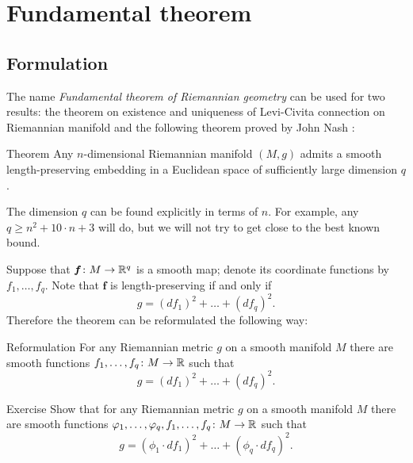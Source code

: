 \chapter{Fundamental theorem}

\section{Formulation}

The name \emph{Fundamental theorem of Riemannian geometry} can be used for two results: the theorem on existence and uniqueness of Levi-Civita connection on Riemannian manifold and the following theorem proved by John Nash \cite{nash}:

\begin{thm}{Theorem}
Any $n$-dimensional Riemannian manifold $(M,g)$ admits a smooth length-preserving embedding in a Euclidean space of sufficiently large dimension $q$.
\end{thm}

The dimension $q$ can be found explicitly in terms of $n$.
For example, any $q\ge n^2+10\cdot n+3$ will do, but we will not try to get close to the best known bound.

Suppose that $\bm{f}\colon M\to \mathbb{R}^q$ is a smooth map;
denote its coordinate functions by $f_1,\dots,f_q$.
Note that $\bm{f}$ is length-preserving if and only if 
\[g=(df_1)^2+\dots+(df_q)^2.\]
Therefore the theorem can be reformulated the following way:

\begin{thm}{Reformulation}
For any Riemannian metric $g$ on a smooth manifold $M$ there are smooth functions $f_1,\dots,f_q\colon M\to\mathbb{R}$ such that 
\[g=(df_1)^2+\dots+(df_q)^2.\]

\end{thm}

\begin{thm}{Exercise}\label{ex:nash}
Show that for any Riemannian metric $g$ on a smooth manifold $M$ there are smooth functions $\varphi_1,\dots,\varphi_q,f_1,\dots,f_q\colon M\to\mathbb{R}$ such that 
\[g=(\phi_1\cdot df_1)^2+\dots+(\phi_q\cdot df_q)^2.\]

\end{thm}
